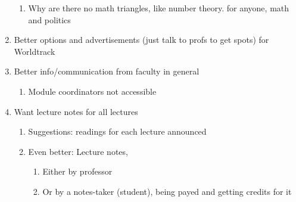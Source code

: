 \begin{enumerate}
\begin{enumerate}
\item Why are there no math triangles, like number theory. for anyone, math and politics
\end{enumerate}
\item Better options and advertisements (just talk to profs to get spots) for Worldtrack
\item Better info/communication from faculty in general
\begin{enumerate}
\item Module coordinators not accessible
\end{enumerate}
\item Want lecture notes for all lectures
\begin{enumerate}
\item Suggestions: readings for each lecture announced
\item Even better: Lecture notes,
\begin{enumerate}
\item Either by professor
\item Or by a notes-taker (student), being payed and getting credits for it
\end{enumerate}
\end{enumerate}
\end{enumerate}
